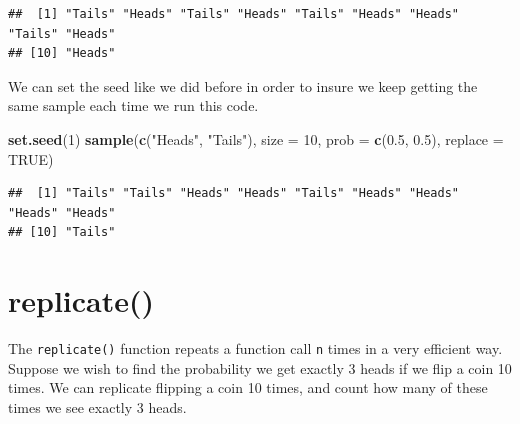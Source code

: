 \documentclass[
]{book}
\newenvironment{Shaded}{\begin{snugshade}}{\end{snugshade}}
\newcommand{\DataTypeTok}[1]{\textcolor[rgb]{0.13,0.29,0.53}{#1}}
\newcommand{\DecValTok}[1]{\textcolor[rgb]{0.00,0.00,0.81}{#1}}
\newcommand{\FloatTok}[1]{\textcolor[rgb]{0.00,0.00,0.81}{#1}}
\newcommand{\KeywordTok}[1]{\textcolor[rgb]{0.13,0.29,0.53}{\textbf{#1}}}
\newcommand{\NormalTok}[1]{#1}
\newcommand{\OtherTok}[1]{\textcolor[rgb]{0.56,0.35,0.01}{#1}}
\newcommand{\StringTok}[1]{\textcolor[rgb]{0.31,0.60,0.02}{#1}}
\begin{document}
\begin{verbatim}
##  [1] "Tails" "Heads" "Tails" "Heads" "Tails" "Heads" "Heads" "Tails" "Heads"
## [10] "Heads"
\end{verbatim}

We can set the seed like we did before in order to insure we keep getting the same sample each time we run this code.

\begin{Shaded}
\begin{Highlighting}[]
\KeywordTok{set.seed}\NormalTok{(}\DecValTok{1}\NormalTok{)}
\KeywordTok{sample}\NormalTok{(}\KeywordTok{c}\NormalTok{(}\StringTok{"Heads"}\NormalTok{, }\StringTok{"Tails"}\NormalTok{), }\DataTypeTok{size =} \DecValTok{10}\NormalTok{, }\DataTypeTok{prob =} \KeywordTok{c}\NormalTok{(}\FloatTok{0.5}\NormalTok{, }\FloatTok{0.5}\NormalTok{), }\DataTypeTok{replace =} \OtherTok{TRUE}\NormalTok{)}
\end{Highlighting}
\end{Shaded}

\begin{verbatim}
##  [1] "Tails" "Tails" "Heads" "Heads" "Tails" "Heads" "Heads" "Heads" "Heads"
## [10] "Tails"
\end{verbatim}

\hypertarget{replicate}{%
\section{replicate()}\label{replicate}}

The \texttt{replicate()} function repeats a function call \texttt{n} times in a very efficient way. Suppose we wish to find the probability we get exactly 3 heads if we flip a coin 10 times. We can replicate flipping a coin 10 times, and count how many of these times we see exactly 3 heads.
\end{document}
